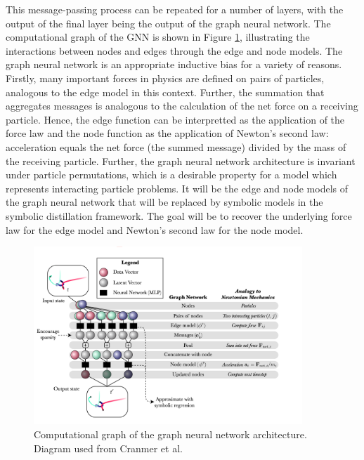 \documentclass[11pt]{article}
\begin{document}
This message-passing process can be repeated for a number of layers, with the output of the final layer being the output of the graph neural network. The computational graph of the GNN is shown in Figure \ref{fig:gnn}, illustrating the interactions between nodes and edges through the edge and node models. The graph neural network is an appropriate inductive bias for a variety of reasons. Firstly, many important forces in physics are defined on pairs of particles, analogous to the edge model in this context. Further, the summation that aggregates messages is analogous to the calculation of the net force on a receiving particle. Hence, the edge function can be interpretted as the application of the force law and the node function as the application of Newton's second law: acceleration equals the net force (the summed message) divided by the mass of the receiving particle. Further, the graph neural network architecture is invariant under particle permutations, which is a desirable property for a model which represents interacting particle problems. It will be the edge and node models of the graph neural network that will be replaced by symbolic models in the symbolic distillation framework. The goal will be to recover the underlying force law for the edge model and Newton's second law for the node model.
\begin{figure}[H]
    \centering
    \includegraphics[width=0.9\textwidth]{figs/gnn_diagram.png}
    \caption{Computational graph of the graph neural network architecture. Diagram used from Cranmer et al. \cite{cranmer2020discoveringsymbolicmodelsdeep}}
    \label{fig:gnn}
\end{figure}

\end{document}
